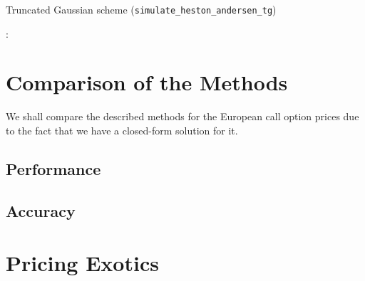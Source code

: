         \begin{algorithm}[htbp]
            \caption{Truncated Gaussian scheme (\texttt{simulate\_heston\_andersen\_tg})}
            \label{alg:andersen_tg}
            \begin{algorithmic}
                : 
            \end{algorithmic}
        \end{algorithm}



\chapter{Comparison of the Methods}
    We shall compare the described methods for the European call option prices due to the fact that we have a closed-form solution for it.
    \section{Performance}

    \section{Accuracy}

\chapter{Pricing Exotics}